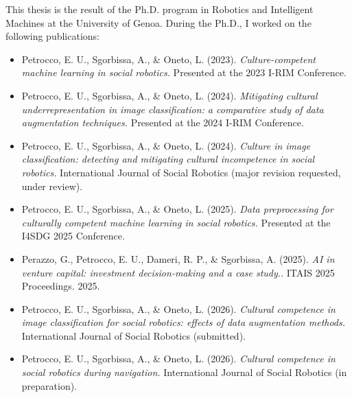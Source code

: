 This thesis is the result of the Ph.D. program in Robotics and Intelligent Machines at the University of Genoa. 
During the Ph.D., I worked on the following publications:

\begin{itemize}
    \item Petrocco, E. U., Sgorbissa, A., \& Oneto, L. (2023). \textit{Culture-competent machine learning in social robotics.} Presented at the 2023 I-RIM Conference.

    \item Petrocco, E. U., Sgorbissa, A., \& Oneto, L. (2024). \textit{Mitigating cultural underrepresentation in image classification: a comparative study of data augmentation techniques.} Presented at the 2024 I-RIM Conference.

    \item Petrocco, E. U., Sgorbissa, A., \& Oneto, L. (2024). \textit{Culture in image classification: detecting and mitigating cultural incompetence in social robotics.} International Journal of Social Robotics (major revision requested, under review).

    \item Petrocco, E. U., Sgorbissa, A., \& Oneto, L. (2025). \textit{Data preprocessing for culturally competent machine learning in social robotics.} Presented at the I4SDG 2025 Conference.

    \item Perazzo, G., Petrocco, E. U., Dameri, R. P., \& Sgorbissa, A. (2025). \textit{AI in venture capital: investment decision-making and a case study.}. ITAIS 2025 Proceedings. 2025.

    \item Petrocco, E. U., Sgorbissa, A., \& Oneto, L. (2026). \textit{Cultural competence in image classification for social robotics: effects of data augmentation methods.} International Journal of Social Robotics (submitted).  

    \item Petrocco, E. U., Sgorbissa, A., \& Oneto, L. (2026). \textit{Cultural competence in social robotics during navigation.} International Journal of Social Robotics (in preparation). 
\end{itemize}